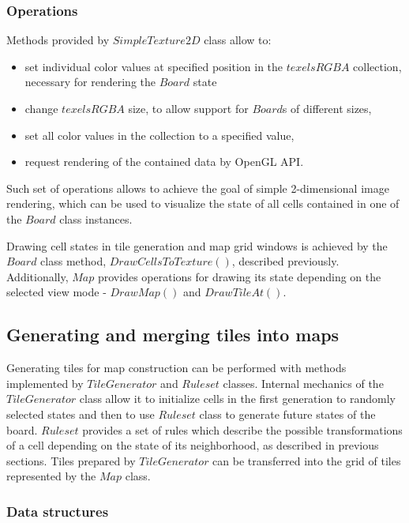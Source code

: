 \documentclass[12pt]{report}
\begin{document}
\subsubsection{Operations}

Methods provided by $SimpleTexture2D$ class allow to:

\begin{itemize}
	\item set individual color values at specified position in the $texelsRGBA$ collection, necessary for rendering the $Board$ state
	\item change $texelsRGBA$ size, to allow support for $Board$s of different sizes,
	\item set all color values in the collection to a specified value,
	\item request rendering of the contained data by OpenGL API.
\end{itemize}  

Such set of operations allows to achieve the goal of simple 2-dimensional image rendering, which can be used to visualize the state of all cells contained in one of the $Board$ class instances.

Drawing cell states in tile generation and map grid windows is achieved by the $Board$ class method, $DrawCellsToTexture()$, described previously. Additionally, $Map$ provides operations for drawing its state depending on the selected view mode - $DrawMap()$ and $DrawTileAt()$.

\subsection{Generating and merging tiles into maps}

Generating tiles for map construction can be performed with methods implemented by $TileGenerator$ and $Ruleset$ classes. Internal mechanics of the $TileGenerator$ class allow it to initialize cells in the first generation to randomly selected states and then to use $Ruleset$ class to generate future states of the board. $Ruleset$ provides a set of rules which describe the possible transformations of a cell depending on the state of its neighborhood, as described in previous sections. Tiles prepared by $TileGenerator$ can be transferred into the grid of tiles represented by the $Map$ class.

\subsubsection{Data structures} 
 
\end{document}
